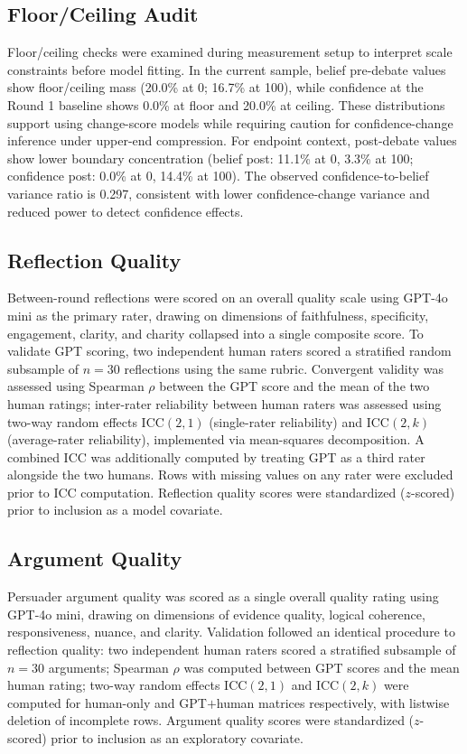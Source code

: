 \subsection{Floor/Ceiling Audit}

Floor/ceiling checks were examined during measurement setup to interpret scale
constraints before model fitting. In the current sample, belief pre-debate values
show floor/ceiling mass (20.0\% at 0; 16.7\% at 100), while confidence at the Round 1 baseline
shows 0.0\% at floor and 20.0\% at ceiling. These distributions support using change-score
models while requiring caution for confidence-change inference under upper-end compression.
For endpoint context, post-debate values show lower boundary concentration
(belief post: 11.1\% at 0, 3.3\% at 100; confidence post: 0.0\% at 0, 14.4\% at 100).
The observed confidence-to-belief variance ratio is 0.297, consistent with lower
confidence-change variance and reduced power to detect confidence effects.

\subsection{Reflection Quality}

Between-round reflections were scored on an overall quality scale
using GPT-4o mini as the primary rater, drawing on dimensions of
faithfulness, specificity, engagement, clarity, and charity
collapsed into a single composite score. To validate GPT scoring,
two independent human raters scored a stratified random subsample
of $n = 30$ reflections using the same rubric. Convergent validity
was assessed using Spearman $\rho$ between the GPT score and the
mean of the two human ratings; inter-rater reliability between
human raters was assessed using two-way random effects ICC$(2,1)$
(single-rater reliability) and ICC$(2,k)$ (average-rater
reliability), implemented via mean-squares decomposition. A
combined ICC was additionally computed by treating GPT as a third
rater alongside the two humans. Rows with missing values on any
rater were excluded prior to ICC computation. Reflection quality
scores were standardized ($z$-scored) prior to inclusion as a
model covariate.

\subsection{Argument Quality}

Persuader argument quality was scored as a single overall quality
rating using GPT-4o mini, drawing on dimensions of evidence
quality, logical coherence, responsiveness, nuance, and clarity.
Validation followed an identical procedure to reflection quality:
two independent human raters scored a stratified subsample of
$n = 30$ arguments; Spearman $\rho$ was computed between GPT
scores and the mean human rating; two-way random effects
ICC$(2,1)$ and ICC$(2,k)$ were computed for human-only and
GPT$+$human matrices respectively, with listwise deletion of
incomplete rows. Argument quality scores were standardized
($z$-scored) prior to inclusion as an exploratory covariate.

